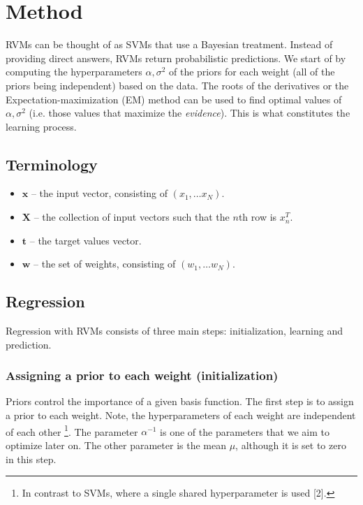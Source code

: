 \section{Method}
RVMs can be thought of as SVMs that use a Bayesian treatment. Instead of providing direct answers, RVMs return probabilistic predictions. We start of by computing the hyperparameters $\alpha,\sigma^2$ of the priors for each weight (all of the priors being independent) based on the data. The roots of the derivatives or the Expectation-maximization (EM) method can be used to find optimal values of $\alpha,\sigma^2$ (i.e. those values that maximize the \textit{evidence}). This is what constitutes the learning process. %

\subsection{Terminology}
\begin{itemize}
	\item $\boldsymbol{x}$ -- the input vector, consisting of $(x_1,\dots x_N)$.
	\item $\boldsymbol{X}$ -- the collection of input vectors such that the $n$th row is $x_n^T$.
	\item $\boldsymbol{t}$ -- the target values vector.
	\item $\boldsymbol{w}$ -- the set of weights, consisting of $(w_1,\dots w_N)$.
\end{itemize}

\subsection{Regression}
Regression with RVMs consists of three main steps: initialization, learning and prediction. 
\subsubsection{Assigning a prior to each weight (initialization)} Priors control the importance of a given basis function. The first step is to assign a prior to each weight. Note, the hyperparameters of each weight are independent of each other \footnote{In contrast to SVMs, where a single shared hyperparameter is used [2].}. The parameter $\alpha^{-1}$ is one of the parameters that we aim to optimize later on. The other parameter is the mean $\mu$, although it is set to zero in this step.

